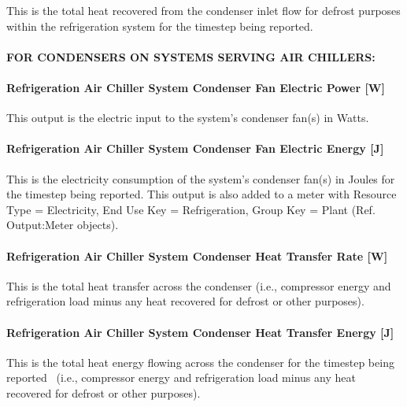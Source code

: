 This is the total heat recovered from the condenser inlet flow for defrost purposes within the refrigeration system for the timestep being reported.

\paragraph{FOR CONDENSERS ON SYSTEMS SERVING AIR CHILLERS:}\label{for-condensers-on-systems-serving-air-chillers}

\paragraph{Refrigeration Air Chiller System Condenser Fan Electric Power {[}W{]}}\label{refrigeration-air-chiller-system-condenser-fan-electric-power-w}

This output is the electric input to the system's condenser fan(s) in Watts.

\paragraph{Refrigeration Air Chiller System Condenser Fan Electric Energy {[}J{]}}\label{refrigeration-air-chiller-system-condenser-fan-electric-energy-j}

This is the electricity consumption of the system's condenser fan(s) in Joules for the timestep being reported. This output is also added to a meter with Resource Type = Electricity, End Use Key = Refrigeration, Group Key = Plant (Ref. Output:Meter objects).

\paragraph{Refrigeration Air Chiller System Condenser Heat Transfer Rate {[}W{]}}\label{refrigeration-air-chiller-system-condenser-heat-transfer-rate-w}

This is the total heat transfer across the condenser (i.e., compressor energy and refrigeration load minus any heat recovered for defrost or other purposes).

\paragraph{Refrigeration Air Chiller System Condenser Heat Transfer Energy {[}J{]}}\label{refrigeration-air-chiller-system-condenser-heat-transfer-energy-j}

This is the total heat energy flowing across the condenser for the timestep being reported~ (i.e., compressor energy and refrigeration load minus any heat recovered for defrost or other purposes).

